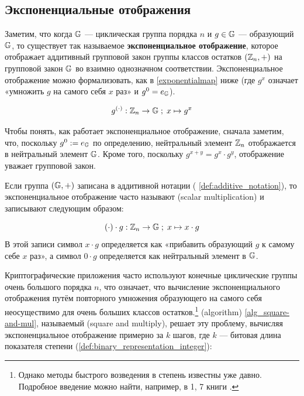 \subsection{Экспоненциальные отображения}
Заметим, что когда $\mathbb{G}$ — циклическая группа порядка $n$ и $g\in \mathbb{G}$ — образующий $\mathbb{G}$, то существует так называемое \textbf{экспоненциальное отображение}, которое отображает аддитивный групповой закон группы классов остатков $(\mathbb{Z}_n,+)$ на групповой закон $\mathbb{G}$ во взаимно однозначном соответствии. Экспоненциальное отображение можно формализовать, как в \eqref{exponentialmap} ниже (где $g^x$ означает «умножить $g$ на самого себя $x$ раз» и $g^0=e_{\mathbb{G}}$).

\begin{equation}\label{exponentialmap}
g^{(\cdot)}: \mathbb{Z}_n \to \mathbb{G}\;;\; x \mapsto g^x
\end{equation}

Чтобы понять, как работает экспоненциальное отображение, сначала заметим, что, поскольку $g^0:=e_{\mathbb{G}}$ по определению, нейтральный элемент $\mathbb{Z}_n$ отображается в нейтральный элемент $\mathbb{G}$. Кроме того, поскольку $g^{x+y}=g^x\cdot g^y$, отображение уважает групповой закон.

\begin{notation}
\label{def:scalar_multiplication} Если группа $(\mathbb{G},+)$ записана в аддитивной нотации (\notationname{} \ref{def:additive_notation}), то экспоненциальное отображение часто называют  (scalar multiplication) и записывают следующим образом:

\begin{equation}\label{scalarmultiplication}
(\cdot)\cdot g: \mathbb{Z}_n \to \mathbb{G}\;;\; x \mapsto x\cdot g
\end{equation}
В этой записи символ $x\cdot g$ определяется как «прибавить образующий $g$ к самому себе $x$ раз», а символ $0\cdot g$ определяется как нейтральный элемент в $\mathbb{G}$.
\end{notation}

Криптографические приложения часто используют конечные циклические группы очень большого порядка $n$, что означает, что вычисление экспоненциального отображения путём повторного умножения образующего на самого себя неосуществимо для очень больших классов остатков.\footnote{Однако методы быстрого возведения в степень известны уже давно. Подробное введение можно найти, например, в \chaptname{} 1, \secname{} 7 книги \cite{mignotte-1992}. }
  (algorithm) \ref{alg_square-and-mul}, называемый  (square and multiply), решает эту проблему, вычисляя экспоненциальное отображение примерно за $k$ шагов, где $k$ — битовая длина показателя степени (\ref{def:binary_representation_integer}):

